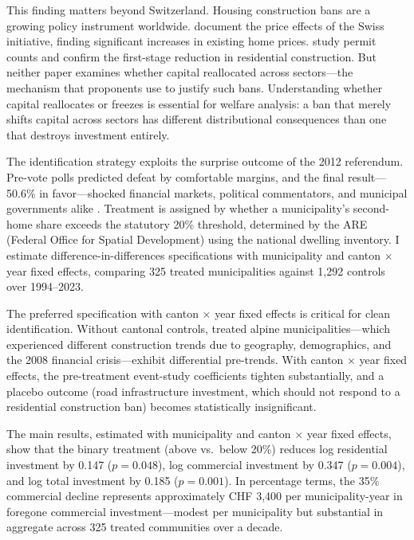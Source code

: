 \documentclass[12pt]{article}
\begin{document}
This finding matters beyond Switzerland. Housing construction bans are a growing policy instrument worldwide. \citet{hilber2020} document the price effects of the Swiss initiative, finding significant increases in existing home prices. \citet{deville2022} study permit counts and confirm the first-stage reduction in residential construction. But neither paper examines whether capital reallocated across sectors---the mechanism that proponents use to justify such bans. Understanding whether capital reallocates or freezes is essential for welfare analysis: a ban that merely shifts capital across sectors has different distributional consequences than one that destroys investment entirely.

The identification strategy exploits the surprise outcome of the 2012 referendum. Pre-vote polls predicted defeat by comfortable margins, and the final result---50.6\% in favor---shocked financial markets, political commentators, and municipal governments alike \citep{brunetti2015}. Treatment is assigned by whether a municipality's second-home share exceeds the statutory 20\% threshold, determined by the ARE (Federal Office for Spatial Development) using the national dwelling inventory. I estimate difference-in-differences specifications with municipality and canton $\times$ year fixed effects, comparing 325 treated municipalities against 1,292 controls over 1994--2023.

The preferred specification with canton $\times$ year fixed effects is critical for clean identification. Without cantonal controls, treated alpine municipalities---which experienced different construction trends due to geography, demographics, and the 2008 financial crisis---exhibit differential pre-trends. With canton $\times$ year fixed effects, the pre-treatment event-study coefficients tighten substantially, and a placebo outcome (road infrastructure investment, which should not respond to a residential construction ban) becomes statistically insignificant.

The main results, estimated with municipality and canton $\times$ year fixed effects, show that the binary treatment (above vs.\ below 20\%) reduces log residential investment by 0.147 ($p = 0.048$), log commercial investment by 0.347 ($p = 0.004$), and log total investment by 0.185 ($p = 0.001$). In percentage terms, the 35\% commercial decline represents approximately CHF 3,400 per municipality-year in foregone commercial investment---modest per municipality but substantial in aggregate across 325 treated communities over a decade.
\end{document}
